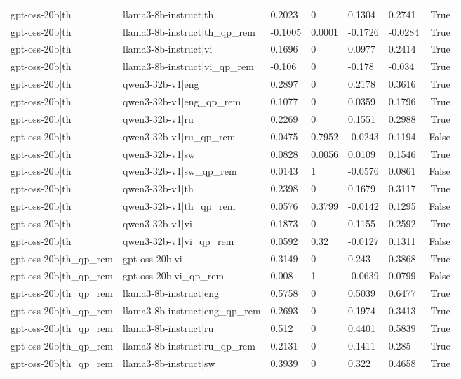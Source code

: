 \begin{table}
\begin{tabular}{llllllr}
gpt-oss-20b|th & llama3-8b-instruct|th & 0.2023 & 0 & 0.1304 & 0.2741 & True \\
gpt-oss-20b|th & llama3-8b-instruct|th_qp_rem & -0.1005 & 0.0001 & -0.1726 & -0.0284 & True \\
gpt-oss-20b|th & llama3-8b-instruct|vi & 0.1696 & 0 & 0.0977 & 0.2414 & True \\
gpt-oss-20b|th & llama3-8b-instruct|vi_qp_rem & -0.106 & 0 & -0.178 & -0.034 & True \\
gpt-oss-20b|th & qwen3-32b-v1|eng & 0.2897 & 0 & 0.2178 & 0.3616 & True \\
gpt-oss-20b|th & qwen3-32b-v1|eng_qp_rem & 0.1077 & 0 & 0.0359 & 0.1796 & True \\
gpt-oss-20b|th & qwen3-32b-v1|ru & 0.2269 & 0 & 0.1551 & 0.2988 & True \\
gpt-oss-20b|th & qwen3-32b-v1|ru_qp_rem & 0.0475 & 0.7952 & -0.0243 & 0.1194 & False \\
gpt-oss-20b|th & qwen3-32b-v1|sw & 0.0828 & 0.0056 & 0.0109 & 0.1546 & True \\
gpt-oss-20b|th & qwen3-32b-v1|sw_qp_rem & 0.0143 & 1 & -0.0576 & 0.0861 & False \\
gpt-oss-20b|th & qwen3-32b-v1|th & 0.2398 & 0 & 0.1679 & 0.3117 & True \\
gpt-oss-20b|th & qwen3-32b-v1|th_qp_rem & 0.0576 & 0.3799 & -0.0142 & 0.1295 & False \\
gpt-oss-20b|th & qwen3-32b-v1|vi & 0.1873 & 0 & 0.1155 & 0.2592 & True \\
gpt-oss-20b|th & qwen3-32b-v1|vi_qp_rem & 0.0592 & 0.32 & -0.0127 & 0.1311 & False \\
gpt-oss-20b|th_qp_rem & gpt-oss-20b|vi & 0.3149 & 0 & 0.243 & 0.3868 & True \\
gpt-oss-20b|th_qp_rem & gpt-oss-20b|vi_qp_rem & 0.008 & 1 & -0.0639 & 0.0799 & False \\
gpt-oss-20b|th_qp_rem & llama3-8b-instruct|eng & 0.5758 & 0 & 0.5039 & 0.6477 & True \\
gpt-oss-20b|th_qp_rem & llama3-8b-instruct|eng_qp_rem & 0.2693 & 0 & 0.1974 & 0.3413 & True \\
gpt-oss-20b|th_qp_rem & llama3-8b-instruct|ru & 0.512 & 0 & 0.4401 & 0.5839 & True \\
gpt-oss-20b|th_qp_rem & llama3-8b-instruct|ru_qp_rem & 0.2131 & 0 & 0.1411 & 0.285 & True \\
gpt-oss-20b|th_qp_rem & llama3-8b-instruct|sw & 0.3939 & 0 & 0.322 & 0.4658 & True \\

\end{tabular}
\end{table}
